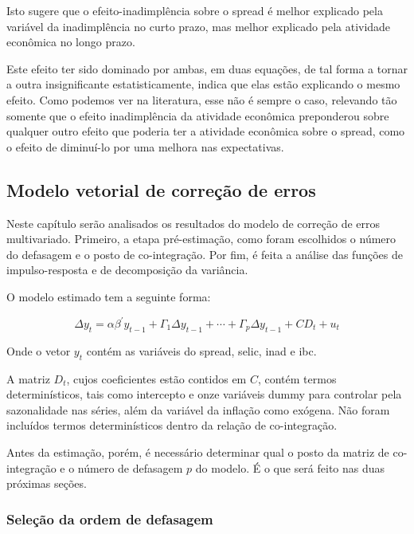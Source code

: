 \documentclass[a4paper,
               article,
               12pt,
               openany,
               oneside,
               english,
               brazil]{abntex2}
\numberwithin{equation}{section}
\begin{document}
    Isto sugere que o efeito-inadimplência sobre o spread é melhor explicado pela variável da inadimplência no curto prazo, mas melhor explicado pela atividade econômica no longo prazo.
    
    Este efeito ter sido dominado por ambas, em duas equações, de tal forma a tornar a outra insignificante estatisticamente, indica que elas estão explicando o mesmo efeito. Como podemos ver na literatura, esse não é sempre o caso, relevando tão somente que o efeito inadimplência da atividade econômica preponderou sobre qualquer outro efeito que poderia ter a atividade econômica sobre o spread, como o efeito de diminuí-lo por uma melhora nas expectativas.

    \subsection{Modelo vetorial de correção de erros}

    Neste capítulo serão analisados os resultados do modelo de correção de erros multivariado. Primeiro, a etapa pré-estimação, como foram escolhidos o número do defasagem e o posto de co-integração. Por fim, é feita a análise das funções de impulso-resposta e de decomposição da variância.

    O modelo estimado tem a seguinte forma:

    \begin{equation}
        \Delta y_t = \alpha \beta^{'} y_{t-1}+ \Gamma_1 \Delta y_{t-1} + \cdots + \Gamma_{p} \Delta y_{t-1} + CD_t + u_t \label{vecm_spread}
    \end{equation}

    Onde o vetor $ y_t $ contém as variáveis do spread, selic, inad e ibc.
    
    A matriz $ D_t $, cujos coeficientes estão contidos em $ C $, contém termos determinísticos, tais como intercepto e onze variáveis dummy para controlar pela sazonalidade nas séries, além da variável da inflação como exógena. Não foram incluídos termos determinísticos dentro da relação de co-integração.

    Antes da estimação, porém, é necessário determinar qual o posto da matriz de co-integração e o número de defasagem $ p $ do modelo. É o que será feito nas duas próximas seções.

    \subsubsection{Seleção da ordem de defasagem}
\end{document}
